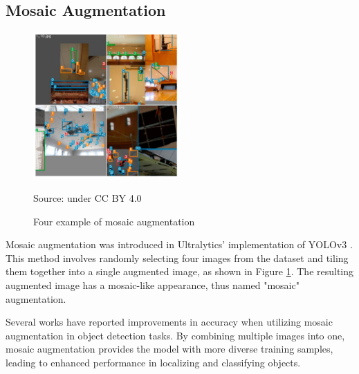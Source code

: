   \subsection{Mosaic Augmentation}
  \label{section:mosaic_study}
  \begin{figure}[t]
    \centering
    \includegraphics[width=0.5\textwidth]{figures/mosaic-aug.png}
    \caption*{Source: \textcite{mosaic} under CC BY 4.0}
    \caption{Four example of mosaic augmentation}
    \label{fig:mosaic}
  \end{figure}
  Mosaic augmentation was introduced in Ultralytics' implementation of YOLOv3 \parencite{mosaic_aug}. 
  This method involves randomly selecting four images from the dataset and tiling them together into a single augmented image, as shown in Figure \ref{fig:mosaic}. 
  The resulting augmented image has a mosaic-like appearance, thus named "mosaic" augmentation.

  Several works \parencites{cspnet}{yolov4}{yolov5} have reported improvements in accuracy when utilizing mosaic augmentation in object detection tasks.
  By combining multiple images into one, mosaic augmentation provides the model with more diverse training samples, leading to enhanced performance in localizing and classifying objects.


